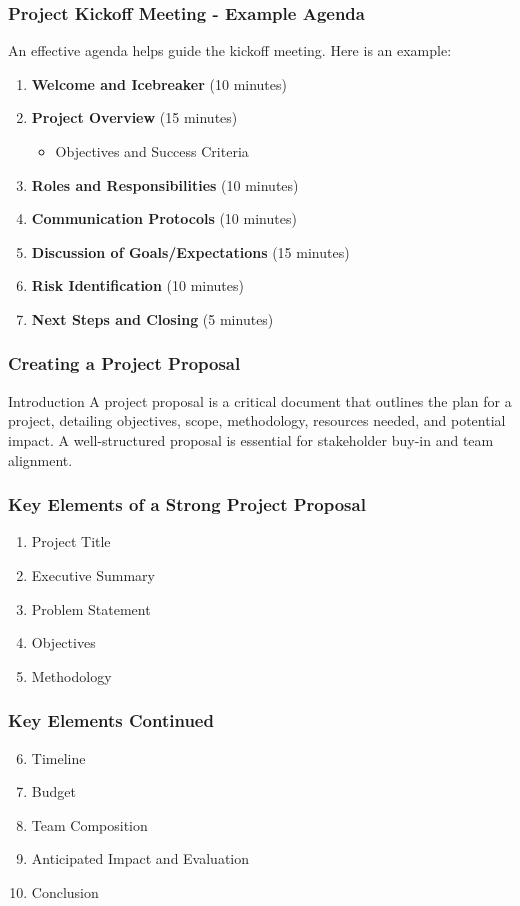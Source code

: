 \documentclass[aspectratio=169]{beamer}
\begin{document}
\begin{frame}[fragile]
    \frametitle{Project Kickoff Meeting - Example Agenda}
    An effective agenda helps guide the kickoff meeting. Here is an example:
    \begin{enumerate}
        \item \textbf{Welcome and Icebreaker} (10 minutes)
        \item \textbf{Project Overview} (15 minutes)
        \begin{itemize}
            \item Objectives and Success Criteria
        \end{itemize}
        \item \textbf{Roles and Responsibilities} (10 minutes)
        \item \textbf{Communication Protocols} (10 minutes)
        \item \textbf{Discussion of Goals/Expectations} (15 minutes)
        \item \textbf{Risk Identification} (10 minutes)
        \item \textbf{Next Steps and Closing} (5 minutes)
    \end{enumerate}
\end{frame}

\begin{frame}[fragile]
    \frametitle{Creating a Project Proposal}
    \begin{block}{Introduction}
        A project proposal is a critical document that outlines the plan for a project, detailing objectives, scope, methodology, resources needed, and potential impact.
        A well-structured proposal is essential for stakeholder buy-in and team alignment.
    \end{block}
\end{frame}

\begin{frame}[fragile]
    \frametitle{Key Elements of a Strong Project Proposal}
    \begin{enumerate}
        \item Project Title
        \item Executive Summary
        \item Problem Statement
        \item Objectives
        \item Methodology
    \end{enumerate}
\end{frame}

\begin{frame}[fragile]
    \frametitle{Key Elements Continued}
    \begin{enumerate}
        \setcounter{enumi}{5} %
        \item Timeline
        \item Budget
        \item Team Composition
        \item Anticipated Impact and Evaluation
        \item Conclusion
    \end{enumerate}
\end{frame}
\end{document}
